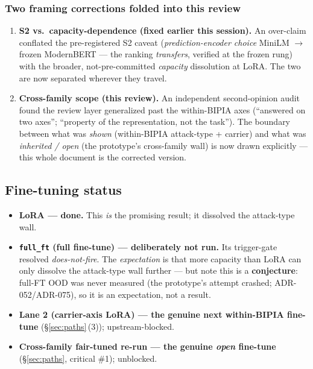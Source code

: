 \documentclass[11pt,parskip=half-]{scrartcl}
\newcommand{\arr}{\ensuremath{\rightarrow}}
\newcommand{\code}[1]{\texttt{\small #1}}
\begin{document}
\subsubsection{Two framing corrections folded into this review}

\begin{enumerate}[leftmargin=1.4em]
  \item \textbf{S2 vs.\ capacity-dependence (fixed earlier this session).} An over-claim conflated the
    pre-registered S2 caveat (\emph{prediction-encoder choice} MiniLM \arr frozen ModernBERT --- the
    ranking \emph{transfers}, verified at the frozen rung) with the broader, not-pre-committed
    \emph{capacity} dissolution at LoRA. The two are now separated wherever they travel.
  \item \textbf{Cross-family scope (this review).} An independent second-opinion audit found the review
    layer generalized past the within-BIPIA axes (``answered on two axes''; ``property of the
    representation, not the task''). The boundary between what was \emph{shown} (within-BIPIA
    attack-type + carrier) and what was \emph{inherited / open} (the prototype's cross-family wall) is
    now drawn explicitly --- this whole document is the corrected version.
\end{enumerate}

\subsection{Fine-tuning status}
\begin{itemize}
  \item \textbf{LoRA --- done.} This \emph{is} the promising result; it dissolved the attack-type wall.
  \item \textbf{\code{full\_ft} (full fine-tune) --- deliberately not run.} Its trigger-gate resolved
    \emph{does-not-fire}. The \emph{expectation} is that more capacity than LoRA can only dissolve the
    attack-type wall further --- but note this is a \textbf{conjecture}: full-FT OOD was never measured
    (the prototype's attempt crashed; ADR-052/ADR-075), so it is an expectation, not a result.
  \item \textbf{Lane 2 (carrier-axis LoRA) --- the genuine next within-BIPIA fine-tune}
    (\S\ref{sec:paths}\,(3)); upstream-blocked.
  \item \textbf{Cross-family fair-tuned re-run --- the genuine \emph{open} fine-tune}
    (\S\ref{sec:paths}, critical \#1); unblocked.
\end{itemize}
\end{document}
